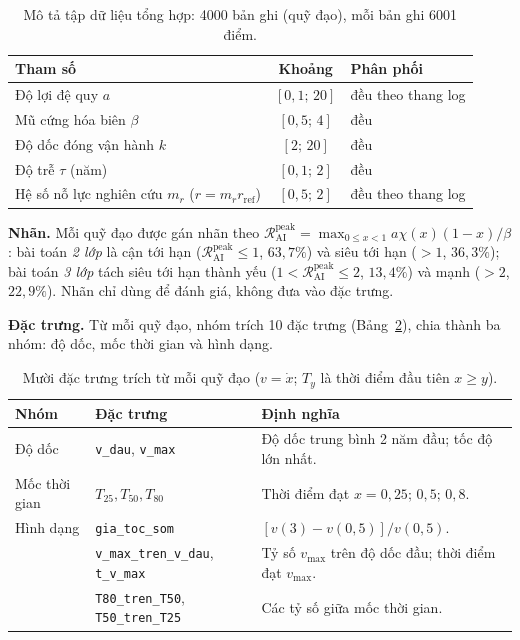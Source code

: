 \documentclass[12pt,a4paper,openany]{report}
\numberwithin{equation}{chapter}   %
\theoremstyle{definition}
\newcommand{\RAI}{\mathcal{R}_{\mathrm{AI}}}
\newcommand{\code}[1]{\texttt{#1}}
\begin{document}
\begin{table}[ht]
\centering
\caption{Mô tả tập dữ liệu tổng hợp: 4000 bản ghi (quỹ đạo), mỗi bản ghi 6001 điểm.}\label{tab:thamso}
\begin{tabular}{@{}lcl@{}}
\toprule
\textbf{Tham số} & \textbf{Khoảng} & \textbf{Phân phối}\\
\midrule
Độ lợi đệ quy $a$ & $[0{,}1;\,20]$ & đều theo thang log\\
Mũ cứng hóa biên $\beta$ & $[0{,}5;\,4]$ & đều\\
Độ dốc đóng vận hành $k$ & $[2;\,20]$ & đều\\
Độ trễ $\tau$ (năm) & $[0{,}1;\,2]$ & đều\\
Hệ số nỗ lực nghiên cứu $m_r$ ($r=m_r r_{\mathrm{ref}}$) & $[0{,}5;\,2]$ & đều theo thang log\\
\bottomrule
\end{tabular}
\end{table}

\textbf{Nhãn.} Mỗi quỹ đạo được gán nhãn theo $\RAI^{\mathrm{peak}}=\max_{0\le x<1}a\chi(x)(1-x)/\beta$: bài toán \emph{2 lớp} là cận tới hạn ($\RAI^{\mathrm{peak}}\le 1$, $63{,}7\%$) và siêu tới hạn ($>1$, $36{,}3\%$); bài toán \emph{3 lớp} tách siêu tới hạn thành yếu ($1<\RAI^{\mathrm{peak}}\le 2$, $13{,}4\%$) và mạnh ($>2$, $22{,}9\%$). Nhãn chỉ dùng để đánh giá, không đưa vào đặc trưng.

\textbf{Đặc trưng.} Từ mỗi quỹ đạo, nhóm trích 10 đặc trưng (Bảng~\ref{tab:dactrung}), chia thành ba nhóm: độ dốc, mốc thời gian và hình dạng.

\begin{table}[ht]
\centering
\caption{Mười đặc trưng trích từ mỗi quỹ đạo ($v=\dot{x}$; $T_y$ là thời điểm đầu tiên $x\ge y$).}\label{tab:dactrung}
\begin{tabular}{@{}llp{7.4cm}@{}}
\toprule
\textbf{Nhóm} & \textbf{Đặc trưng} & \textbf{Định nghĩa}\\
\midrule
Độ dốc & \code{v\_dau}, \code{v\_max} & Độ dốc trung bình 2 năm đầu; tốc độ lớn nhất.\\
Mốc thời gian & $T_{25},T_{50},T_{80}$ & Thời điểm đạt $x=0{,}25;\,0{,}5;\,0{,}8$.\\
Hình dạng & \code{gia\_toc\_som} & $[v(3)-v(0{,}5)]/v(0{,}5)$.\\
 & \code{v\_max\_tren\_v\_dau}, \code{t\_v\_max} & Tỷ số $v_{\max}$ trên độ dốc đầu; thời điểm đạt $v_{\max}$.\\
 & \code{T80\_tren\_T50}, \code{T50\_tren\_T25} & Các tỷ số giữa mốc thời gian.\\
\bottomrule
\end{tabular}
\end{table}
\end{document}
